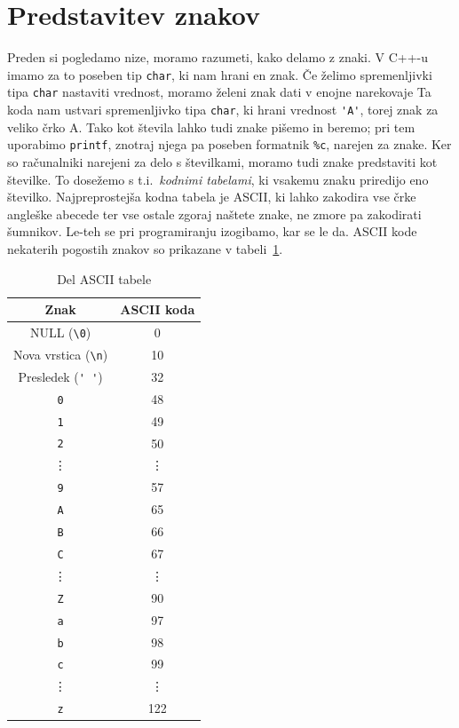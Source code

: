 \documentclass{book}
\begin{document}
\section{Predstavitev znakov}

Preden si pogledamo nize, moramo razumeti, kako delamo z znaki.
V C++-u imamo za to poseben tip \verb+char+, ki nam hrani en znak.
Če želimo spremenljivki tipa \verb+char+ nastaviti vrednost, moramo želeni znak
dati v enojne narekovaje
Ta koda nam ustvari spremenljivko tipa \verb+char+, ki hrani vrednost
\verb+'A'+, torej znak za veliko črko A.
Tako kot števila lahko tudi znake pišemo in beremo; pri tem uporabimo
\verb+printf+, znotraj njega pa poseben formatnik \verb+%c+, narejen za znake.
Ker so računalniki narejeni za delo s številkami, moramo tudi znake
predstaviti kot številke.
To dosežemo s t.i.~\textit{kodnimi tabelami}, ki vsakemu znaku priredijo eno
številko.
Najpreprostejša kodna tabela je ASCII, ki lahko zakodira vse črke angleške
abecede ter vse ostale zgoraj naštete znake, ne zmore pa zakodirati šumnikov.
Le-teh se pri programiranju izogibamo, kar se le da.
ASCII kode nekaterih pogostih znakov so prikazane v tabeli~\ref{tab:ascii}.

\begin{table}[h!]
  \centering
  \begin{tabular}[h!]{|c|c|}
	\hline
	Znak & ASCII koda \\
	\hline
	NULL (\verb+\0+) & 0 \\
	Nova vrstica (\verb+\n+) & 10 \\
	Presledek (\verb+' '+) & 32 \\
	\hline
	\verb+0+ & 48 \\
	\verb+1+ & 49 \\
	\verb+2+ & 50 \\
	\vdots & \vdots \\
	\verb+9+ & 57 \\
	\hline
	\verb+A+ & 65 \\
	\verb+B+ & 66 \\
	\verb+C+ & 67 \\
	\vdots & \vdots \\
	\verb+Z+ & 90 \\
	\hline
	\verb+a+ & 97 \\
	\verb+b+ & 98 \\
	\verb+c+ & 99 \\
	\vdots & \vdots \\
	\verb+z+ & 122 \\
	\hline
  \end{tabular}
  \caption{Del ASCII tabele}
  \label{tab:ascii}
\end{table}
\end{document}

